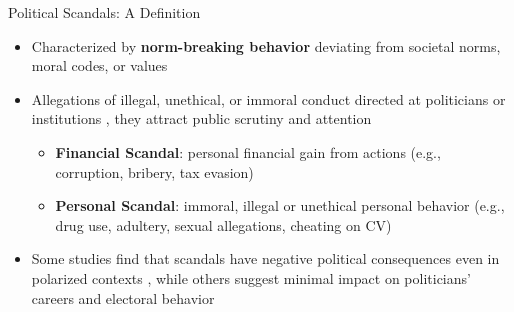 \documentclass[10pt, aspectratio=169]{beamer}
\newcommand{\customcite}[1]{\textcolor{blue}{\parencite{#1}}}
\newcommand{\customcites}[1]{\textcolor{blue}{\parencites{#1}}}
\begin{document}
\begin{frame}{Political Scandals: A Definition}
    \begin{itemize}
        \item Characterized by \textbf{norm-breaking behavior} deviating from societal norms, moral codes, or values \customcites{genovese_2010, Thompson_2013} \vspace{0.3cm}
        \item Allegations of illegal, unethical, or immoral conduct directed at politicians or institutions \customcite{Rottinghaus_2023}, they attract public scrutiny and attention \customcites{Thompson_2013, Marion_2010}\vspace{0.2cm}
        \begin{itemize}
        \item \textbf{Financial Scandal}: personal financial gain from actions (e.g., corruption, bribery, tax evasion) 
        \item \textbf{Personal Scandal}: immoral, illegal or unethical personal behavior (e.g., drug use, adultery, sexual allegations, cheating on CV) \vspace{0.3cm}
        \end{itemize}
        \item Some studies find that scandals have negative political consequences even in polarized contexts \customcites{darr2019collision, wolsky2022scandal}, while others suggest minimal impact on politicians' careers and electoral behavior \customcites{funck2021partisanship, Lee_2023}
    \end{itemize}
\end{frame}
\end{document}
